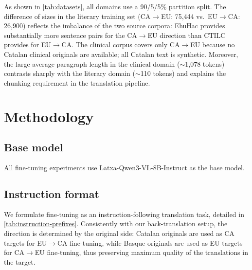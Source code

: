 \documentclass[11pt,a4paper]{article}
\begin{document}
As shown in \autoref{tab:datasets}, all domains use a 90/5/5\% partition split.
The difference of sizes in the literary training set
(CA$\to$EU: 75,444 vs.\ EU$\to$CA: 26,900) reflects the imbalance of the two source corpora: EhuHac provides substantially more
sentence pairs for the CA$\to$EU direction than CTILC provides for
EU$\to$CA. The clinical corpus covers only CA$\to$EU because no
Catalan clinical originals are available; all Catalan text is synthetic.
Moreover, the large average paragraph length in the clinical domain ($\sim$1,078
tokens) contrasts sharply with the literary domain ($\sim$110 tokens)
and explains the chunking requirement in the translation pipeline.



\section{Methodology}
\label{sec:methodology}

\subsection{Base model}
All fine-tuning experiments use Latxa-Qwen3-VL-8B-Instruct as the base
model. 

\subsection{Instruction format}\label{sec:instruction}

We formulate fine-tuning as an instruction-following translation task, detailed in \autoref{tab:instruction-prefixes}.
Consistently with our back-translation setup, the direction is determined
by the original side: Catalan originals are used as CA
targets for EU$\to$CA fine-tuning, while Basque originals are used as EU
targets for CA$\to$EU fine-tuning, thus preserving maximum quality of the translations in the target.

\begin{table}[H]
\small
\centering
{}
\caption{Instruction prefixes used for each translation direction and domain.}
\label{tab:instruction-prefixes}
\end{table}
\end{document}
